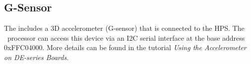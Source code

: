 \subsection{G-Sensor}
\label{sec:G_sensor}
The {\it \systemNameFull} includes a 3D accelerometer (G-sensor) that is connected to the HPS.
The \processor~processor can access this device via an I2C serial interface at the base
address {\sf 0xFFC04000}. More details can be found in the
tutorial {\it Using the Accelerometer on DE-series Boards}.


